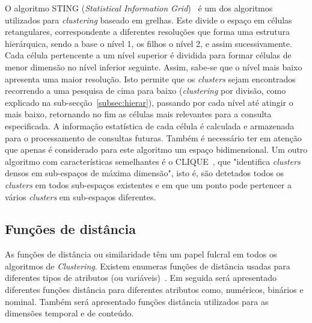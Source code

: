 O algoritmo STING (\textit{Statistical Information Grid})~\citet{Wang1997} é um dos algoritmos utilizados para \textit{clustering} baseado em grelhas. Este divide o espaço em células retangulares, correspondente a diferentes resoluções que forma uma estrutura hierárquica, sendo a base o nível 1, os filhos o nível 2, e assim sucessivamente. Cada célula pertencente a um nível superior é dividida para formar células de menor dimensão no nível inferior seguinte. Assim, sabe-se que o nível mais baixo apresenta uma maior resolução. Isto permite que os \textit{clusters} sejam encontrados recorrendo a uma pesquisa de cima para baixo (\textit{clustering} por divisão, como explicado na sub-secção~\ref{subsec:hierar}), passando por cada nível até atingir o mais baixo, retornando no fim as células mais relevantes para a consulta especificada. A informação estatística de cada célula é calculada e armazenada para o processamento de consultas futuras. Também é necessário ter em atenção que apenas é considerado para este algoritmo um espaço bidimensional. Um outro algoritmo com características semelhantes é o CLIQUE~\citet{Agrawal1998}, que "identifica \textit{clusters} densos em sub-espaços de máxima dimensão", isto é, são detetados todos os \textit{clusters} em todos sub-espaços existentes e em que um ponto pode pertencer a vários \textit{clusters} em sub-espaços diferentes.


%

\subsection{Funções de distância} \label{subsec:dist}

As funções de distância ou similaridade têm um papel fulcral em todos os algoritmos de \textit{Clustering}. Existem enumeras funções de distância usadas para diferentes tipos de atributos (ou variáveis)~\citet{Liu2011}. Em seguida será apresentado diferentes funções distância para diferentes atributos como, numéricos, binários e nominal. Também será apresentado funções distância utilizados para as dimensões temporal e de conteúdo. 

